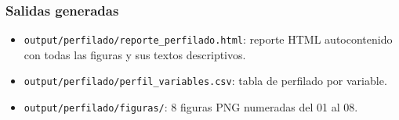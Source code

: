\documentclass[12pt,a4paper]{article}
\begin{document}
\subsubsection{Salidas generadas}
\begin{itemize}
  \item \texttt{output/perfilado/reporte\_perfilado.html}: reporte HTML autocontenido con todas las figuras y sus textos descriptivos.
  \item \texttt{output/perfilado/perfil\_variables.csv}: tabla de perfilado por variable.
  \item \texttt{output/perfilado/figuras/}: 8 figuras PNG numeradas del 01 al 08.
\end{itemize}
\end{document}
